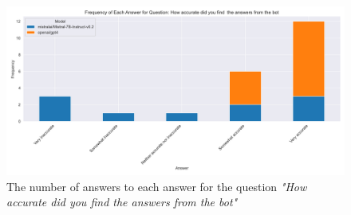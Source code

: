 \begin{figure}[H]
    \centering
    \includegraphics[width=\textwidth]{results/plots/assets/feedback-02-frequency-of-answer-for-question-per-model-ead094.png}
    \caption{The number of answers to each answer for the question \textit{"How accurate did you find  the answers from the bot"}}
    \label{fig:feedback_02_frequency_of_answer_for_question_per_model_ead094}
\end{figure}